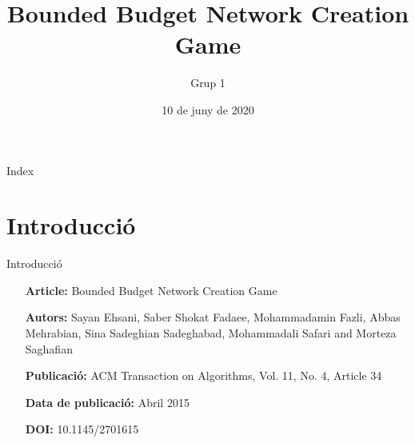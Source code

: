 \documentclass[aspectratio=169,handout]{beamer}
\title[Bounded Budget Network Creation Game]{Bounded Budget Network Creation Game}
\subtitle{}
\author{Grup 1}
\institute{UPC - AA}
\date{10 de juny de 2020}
\begin{document}
\begin{frame}
  \titlepage
\end{frame}

\begin{frame}{Index}
  \tableofcontents
\end{frame}

\section{Introducció}

\begin{frame}{Introducció}
    \setlength{\leftmargini}{10em}
    \begin{itemize}
        \itemsep=1em
        \item[\textbf{Article:}] Bounded Budget Network Creation Game
        \item[\textbf{Autors:}] Sayan Ehsani, Saber Shokat Fadaee, Mohammadamin Fazli, Abbas Mehrabian, Sina Sadeghian Sadeghabad, Mohammadali Safari and Morteza Saghafian
        \item[\textbf{Publicació:}] ACM Transaction on Algorithms, Vol. 11, No. 4, Article 34
        \item[\textbf{Data de publicació:}] Abril 2015
        \item[\textbf{DOI:}] 10.1145/2701615
    \end{itemize}
\end{frame}
\end{document}
